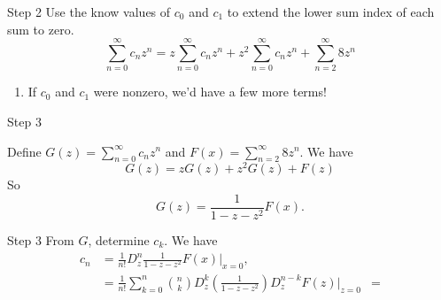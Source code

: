 \documentclass[portrait,fleqn,12pt]{beamer}
\newenvironment{handlist}
   {\begin{enumerate}[\faHandPointRight]
       \addtolength{\itemsep}{0.0\itemsep}}
     {\end{enumerate}}
\begin{document}
\begin{frame}{Step 2}
Use the know values of $c_0$ and $c_1$ to extend the lower sum index of each sum to zero.
\begin{equation}
  \sum_{n=0}^\infty c_{n} z^n  =  z \sum_{n=0}^\infty c_{n} z^{n} +  z^2 \sum_{n=0}^\infty c_{n} z^{n} +  \sum_{n=2}^\infty 8 z^n
\end{equation}
\begin{handlist}
\item If $c_0$ and $c_1$ were nonzero, we'd have a few more terms!
\end{handlist}
\end{frame}

\begin{frame}{Step 3}

Define $G(z) =  \sum_{n=0}^\infty c_{n} z^n$ and $F(x) = \sum_{n=2}^\infty 8 z^n$. We have
\begin{equation}
  G(z) = z G(z) + z^2 G(z) + F(z)
\end{equation}
So 
\begin{equation}
  G(z) = \frac{1}{1-z-z^2} F(x).
\end{equation}



\end{frame}
\begin{frame}{Step 3}
From $G$, determine $c_k$. We have
\begin{align*}
 c_n &= \frac{1}{n!} D^n_z  \frac{1}{1-z-z^2} F(x) \vert_{x=0}, \\
       &= \frac{1}{n!}  \sum_{k=0}^n \binom{n}{k} D^k_z \left( \frac{1}{1-z-z^2} \right)  D^{n-k} _z F(z ) \vert_{z=0} 
       &= 
\end{align*}

\end{frame}
\end{document}

